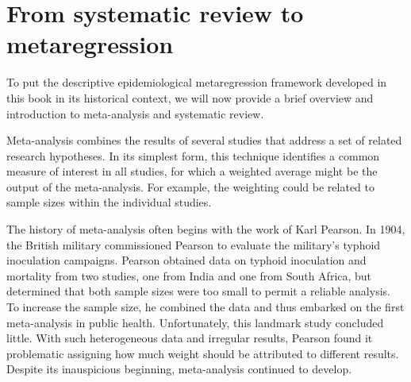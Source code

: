 \section{From systematic review to metaregression}
To put the descriptive epidemiological metaregression framework
developed in this book in its historical context, we will now
provide a brief overview and introduction to meta-analysis and
systematic review.

Meta-analysis combines the results of several studies that address a
set of related research hypotheses. In its simplest form, this
technique identifies a common measure of interest in all studies, for
which a weighted average might be the output of the meta-analysis.
For example, the weighting could be related to sample sizes within the individual
studies.

The history of meta-analysis often begins with the work of Karl
Pearson.  In 1904, the British military commissioned Pearson to
evaluate the military's typhoid inoculation
campaigns.\cite{Pearson_Report_1904} Pearson obtained data on typhoid
inoculation and mortality from two studies, one from India and one
from South Africa, but determined that both
sample sizes were too small to permit a reliable analysis. To increase the sample
size, he combined the data and thus embarked on the first
meta-analysis in public health. Unfortunately, this landmark study concluded little.
With such heterogeneous data and irregular results, Pearson found
it problematic assigning how much weight should be attributed to
different results.  Despite its inauspicious beginning, meta-analysis
continued to develop.


